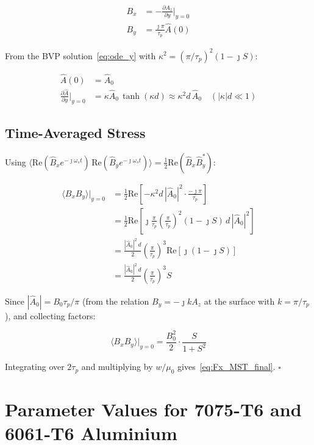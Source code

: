 \documentclass[12pt, a4paper]{article}
\theoremstyle{plain}
\theoremstyle{definition}
\newcommand{\taup}{\tau_p}
\newcommand{\oms}{\omega_s}
\newcommand{\muZ}{\mu_0}
\newcommand{\avg}[1]{\langle #1 \rangle}
\newcommand{\Der}[2]{\frac{\partial #1}{\partial #2}}
\begin{document}
\begin{align}
  B_x &= -\Der{A_z}{y}\bigg|_{y=0} \\
  B_y &= \frac{\jmath\pi}{\taup}\hat{A}(0)
\end{align}

From the BVP solution~\eqref{eq:ode_y} with $\kappa^2 = (\pi/\taup)^2(1-\jmath S)$:

\begin{align}
  \hat{A}(0) &= \hat{A}_0 \\
  \Der{\hat{A}}{y}\bigg|_{y=0} &= \kappa\hat{A}_0\,\tanh(\kappa d)
                                 \approx \kappa^2 d\,\hat{A}_0 \quad (|\kappa|d \ll 1)
\end{align}

\subsection{Time-Averaged Stress}

Using $\avg{\mathrm{Re}(\hat{B}_x e^{-\jmath\oms t})\,\mathrm{Re}(\hat{B}_y e^{-\jmath\oms t})}
= \tfrac{1}{2}\mathrm{Re}(\hat{B}_x\hat{B}_y^*)$:

\begin{align}
  \avg{B_x B_y}\big|_{y=0}
    &= \frac{1}{2}\mathrm{Re}\!\left[-\kappa^2 d\,|\hat{A}_0|^2 \cdot
       \frac{-\jmath\pi}{\taup}\right] \nonumber\\
    &= \frac{1}{2}\mathrm{Re}\!\left[\jmath\frac{\pi}{\taup}
       \left(\frac{\pi}{\taup}\right)^2(1-\jmath S)\,d\,|\hat{A}_0|^2\right] \nonumber\\
    &= \frac{|\hat{A}_0|^2\,d}{2}\left(\frac{\pi}{\taup}\right)^3\mathrm{Re}[\jmath(1-\jmath S)] \nonumber\\
    &= \frac{|\hat{A}_0|^2\,d}{2}\left(\frac{\pi}{\taup}\right)^3 S
\end{align}

Since $|\hat{A}_0| = B_0\taup/\pi$ (from the relation $B_y = -\jmath k A_z$ at the surface
with $k = \pi/\taup$), and collecting factors:

\begin{equation}
  \avg{B_x B_y}\big|_{y=0}
  = \frac{B_0^2}{2}\cdot\frac{S}{1+S^2}
\end{equation}

Integrating over $2\taup$ and multiplying by $w/\muZ$ gives~\eqref{eq:Fx_MST_final}.
$\square$


\section{Parameter Values for 7075-T6 and 6061-T6 Aluminium}
\label{app:params}
\end{document}
